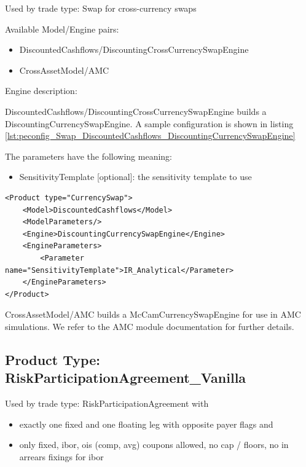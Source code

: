 Used by trade type: Swap for cross-currency swaps

Available Model/Engine pairs:

\begin{itemize}
\item DiscountedCashflows/DiscountingCrossCurrencySwapEngine
\item CrossAssetModel/AMC
\end{itemize}

Engine description:

DiscountedCashflows/DiscountingCrossCurrencySwapEngine builds a DiscountingCurrencySwapEngine. A sample configuration is
shown in listing \ref{lst:peconfig_Swap_DiscountedCashflows_DiscountingCurrencySwapEngine}

The parameters have the following meaning:

\begin{itemize}
\item SensitivityTemplate [optional]: the sensitivity template to use
\end{itemize}

\begin{longlisting}
\begin{verbatim}
<Product type="CurrencySwap">
    <Model>DiscountedCashflows</Model>
    <ModelParameters/>
    <Engine>DiscountingCurrencySwapEngine</Engine>
    <EngineParameters>
        <Parameter name="SensitivityTemplate">IR_Analytical</Parameter>
    </EngineParameters>
</Product>
\end{verbatim}
\caption{Configuration for Product Swap, Model DiscountedCashflows, Engine DiscountingCurrencySwapEngine}
\label{lst:peconfig_Swap_DiscountedCashflows_DiscountingCurrencySwapEngine}
\end{longlisting}

CrossAssetModel/AMC builds a McCamCurrencySwapEngine for use in AMC simulations. We refer to the AMC module
documentation for further details.

\subsection{Product Type: RiskParticipationAgreement\_Vanilla}

Used by trade type: RiskParticipationAgreement with

\begin{itemize}
\item exactly one fixed and one floating leg with opposite payer flags and
\item only fixed, ibor, ois (comp, avg) coupons allowed, no cap / floors, no in arrears fixings for ibor
\end{itemize}

